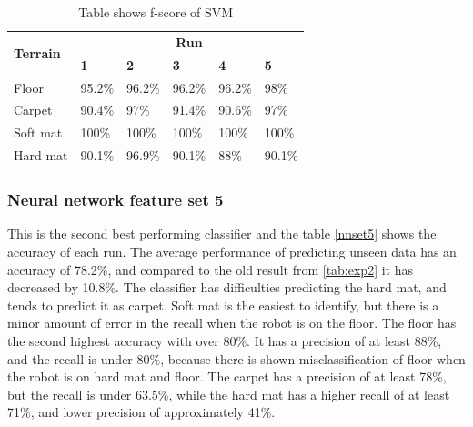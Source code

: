 \documentclass[USenglish]{ifimaster}  %
\begin{document}
	\begin{table}[h]
		\centering
		\begin{tabular}{@{}llllll@{}}
			\toprule
			\multirow{2}{*}{\textbf{Terrain}} & \multicolumn{5}{c}{\textbf{Run}} \\ \cmidrule(l){2-6} 
			& \multicolumn{1}{l|}{\textbf{1}} & \multicolumn{1}{l|}{\textbf{2}} & \multicolumn{1}{l|}{\textbf{3}} & \multicolumn{1}{l|}{\textbf{4}} & \textbf{5} \\ \midrule
			\multicolumn{1}{l|}{Floor} & \multicolumn{1}{l|}{95.2\%} & \multicolumn{1}{l|}{96.2\%} & \multicolumn{1}{l|}{96.2\%} & \multicolumn{1}{l|}{96.2\%} & 98\% \\ \midrule
			\multicolumn{1}{l|}{Carpet} & \multicolumn{1}{l|}{90.4\%} & \multicolumn{1}{l|}{97\%} & \multicolumn{1}{l|}{91.4\%} & \multicolumn{1}{l|}{90.6\%} & 97\% \\ \midrule
			\multicolumn{1}{l|}{Soft mat} & \multicolumn{1}{l|}{100\%} & \multicolumn{1}{l|}{100\%} & \multicolumn{1}{l|}{100\%} & \multicolumn{1}{l|}{100\%} & 100\% \\ \midrule
			\multicolumn{1}{l|}{Hard mat} & \multicolumn{1}{l|}{90.1\%} & \multicolumn{1}{l|}{96.9\%} & \multicolumn{1}{l|}{90.1\%} & \multicolumn{1}{l|}{88\%} & 90.1\% \\ \bottomrule
		\end{tabular}
		\caption{Table shows f-score of SVM}
		\label{fscoresvm}
	\end{table}
	\FloatBarrier
\newpage
\subsubsection{Neural network feature set 5}
This is the second best performing classifier and the table \ref{nnset5} shows the accuracy of each run. The average performance of predicting unseen data has an accuracy of 78.2\%, and compared to the old result from \ref{tab:exp2} it has decreased by 10.8\%. The classifier has difficulties predicting the hard mat, and tends to predict it as carpet. Soft mat is the easiest to identify, but there is a minor amount of error in the recall when the robot is on the floor. The floor has the second highest accuracy with over 80\%. It has a precision of at least 88\%, and the recall is under 80\%, because there is shown misclassification of floor when the robot is on hard mat and floor. The carpet has a precision of at least 78\%, but the recall is under 63.5\%, while the hard mat has a higher recall of at least 71\%, and lower precision of approximately 41\%.
\end{document}
